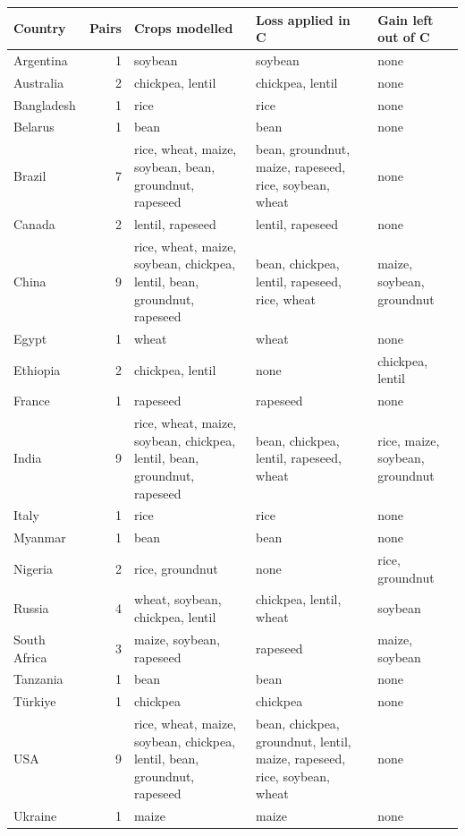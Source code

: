 \begin{tabular}{@{}lrp{4.6cm}p{3.6cm}p{3.0cm}@{}}
\toprule
Country & Pairs & Crops modelled & Loss applied in C & Gain left out of C \\
\midrule
Argentina & 1 & soybean & soybean & none \\
Australia & 2 & chickpea, lentil & chickpea, lentil & none \\
Bangladesh & 1 & rice & rice & none \\
Belarus & 1 & bean & bean & none \\
Brazil & 7 & rice, wheat, maize, soybean, bean, groundnut, rapeseed & bean, groundnut, maize, rapeseed, rice, soybean, wheat & none \\
Canada & 2 & lentil, rapeseed & lentil, rapeseed & none \\
China & 9 & rice, wheat, maize, soybean, chickpea, lentil, bean, groundnut, rapeseed & bean, chickpea, lentil, rapeseed, rice, wheat & maize, soybean, groundnut \\
Egypt & 1 & wheat & wheat & none \\
Ethiopia & 2 & chickpea, lentil & none & chickpea, lentil \\
France & 1 & rapeseed & rapeseed & none \\
India & 9 & rice, wheat, maize, soybean, chickpea, lentil, bean, groundnut, rapeseed & bean, chickpea, lentil, rapeseed, wheat & rice, maize, soybean, groundnut \\
Italy & 1 & rice & rice & none \\
Myanmar & 1 & bean & bean & none \\
Nigeria & 2 & rice, groundnut & none & rice, groundnut \\
Russia & 4 & wheat, soybean, chickpea, lentil & chickpea, lentil, wheat & soybean \\
South Africa & 3 & maize, soybean, rapeseed & rapeseed & maize, soybean \\
Tanzania & 1 & bean & bean & none \\
T\"urkiye & 1 & chickpea & chickpea & none \\
USA & 9 & rice, wheat, maize, soybean, chickpea, lentil, bean, groundnut, rapeseed & bean, chickpea, groundnut, lentil, maize, rapeseed, rice, soybean, wheat & none \\
Ukraine & 1 & maize & maize & none \\
\bottomrule
\end{tabular}
